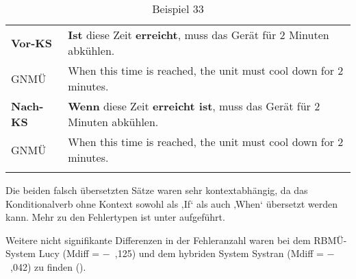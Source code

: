 \begin{table}
\begin{tabularx}{\textwidth}{lX}

\lsptoprule
\textbf{Vor-KS} & \textbf{Ist} diese Zeit \textbf{erreicht}, muss das Gerät für 2 Minuten abkühlen.\\
\tablevspace
GNMÜ & \textcolor{lsRed}{When} this time is reached, the unit must cool down for 2 minutes.\\
\midrule
\textbf{Nach-KS} & \textbf{Wenn} diese Zeit \textbf{erreicht ist}, muss das Gerät für 2 Minuten abkühlen.\\
\tablevspace
GNMÜ & \textcolor{lsRed}{When} this time is reached, the unit must cool down for 2 minutes.\\
\lspbottomrule
\end{tabularx}
\caption{\label{tabex:05:33} Beispiel 33 }
\end{table}

Die beiden falsch übersetzten Sätze waren sehr kontextabhängig, da das Konditionalverb ohne Kontext sowohl als ‚If‘ als auch ‚When‘ übersetzt werden kann. Mehr zu den Fehlertypen ist unter  aufgeführt.

Weitere nicht signifikante Differenzen in der Fehleranzahl waren bei dem RBMÜ-System Lucy (Mdiff = $-$~,125) und dem hybriden System Systran (Mdiff = $-$~,042) zu finden ().


